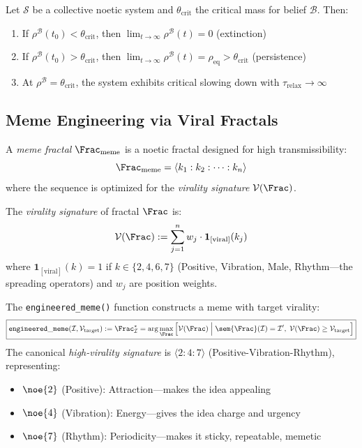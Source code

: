 \begin{theorem}
\label{thm:tipping-dynamics}
Let $\mathcal{S}$ be a collective noetic system and $\theta_{\mathrm{crit}}$ the critical mass for belief $\mathcal{B}$. Then:
\begin{enumerate}
    \item If $\rho^{\mathcal{B}}(t_0) < \theta_{\mathrm{crit}}$, then $\lim_{t \to \infty} \rho^{\mathcal{B}}(t) = 0$ (extinction)
    \item If $\rho^{\mathcal{B}}(t_0) > \theta_{\mathrm{crit}}$, then $\lim_{t \to \infty} \rho^{\mathcal{B}}(t) = \rho_{\mathrm{eq}} > \theta_{\mathrm{crit}}$ (persistence)
    \item At $\rho^{\mathcal{B}} = \theta_{\mathrm{crit}}$, the system exhibits critical slowing down with $\tau_{\mathrm{relax}} \to \infty$
\end{enumerate}
\end{theorem}

\subsection{Meme Engineering via Viral Fractals}

\begin{definition}
\label{def:meme-fractal}
A \emph{meme fractal} $\Frac_{\mathrm{meme}}$ is a noetic fractal designed for high transmissibility:
\[
    \Frac_{\mathrm{meme}} = \langle k_1 : k_2 : \cdots : k_n \rangle
\]
where the sequence is optimized for the \emph{virality signature} $\mathcal{V}(\Frac)$.
\end{definition}

\begin{definition}
\label{def:virality-signature}
The \emph{virality signature} of fractal $\Frac$ is:
\[
    \mathcal{V}(\Frac) := \sum_{j=1}^{n} w_j \cdot \mathbf{1}_{[\text{viral}]}(k_j)
\]
where $\mathbf{1}_{[\text{viral}]}(k) = 1$ if $k \in \{2, 4, 6, 7\}$ (Positive, Vibration, Male, Rhythm---the spreading operators) and $w_j$ are position weights.
\end{definition}

\begin{definition}
\label{def:engineered-meme}
The \texttt{engineered\_meme()} function constructs a meme with target virality:
\[
\boxed{
    \mathtt{engineered\_meme}(\mathcal{I}, \mathcal{V}_{\mathrm{target}}) :=
    \Frac_{\mathcal{I}}^* = \arg\max_{\Frac} \left[ \mathcal{V}(\Frac) \;\Big|\;
    \sem{\Frac}(\mathcal{I}) = \mathcal{I}', \; \mathcal{V}(\Frac) \geq \mathcal{V}_{\mathrm{target}} \right]
}
\]
The canonical \emph{high-virality signature} is $\langle 2:4:7 \rangle$ (Positive-Vibration-Rhythm), representing:
\begin{itemize}
    \item $\noe{2}$ (Positive): Attraction---makes the idea appealing
    \item $\noe{4}$ (Vibration): Energy---gives the idea charge and urgency
    \item $\noe{7}$ (Rhythm): Periodicity---makes it sticky, repeatable, memetic
\end{itemize}
\end{definition}

